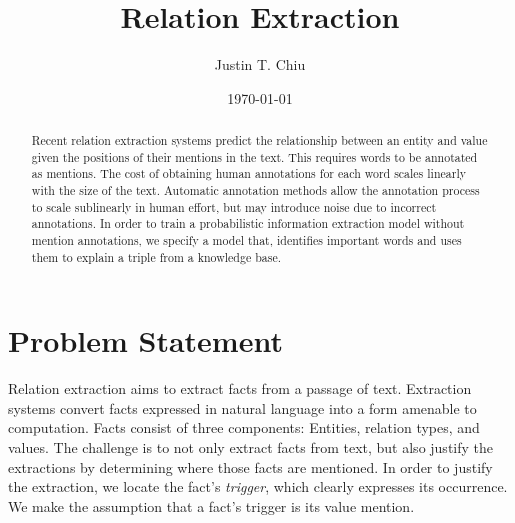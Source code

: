 \documentclass[12pt]{article}
\title{Relation Extraction}
\author{
Justin T. Chiu
}
\date{\today}
\begin{document}
\maketitle

\begin{abstract}
Recent relation extraction systems predict the relationship between
an entity and value given the positions of their mentions in the text.
This requires words to be annotated as mentions.
The cost of obtaining human annotations for each word scales
linearly with the size of the text.
Automatic annotation methods allow the annotation process to scale sublinearly
in human effort, but may introduce noise due to incorrect annotations.
In order to train a probabilistic information extraction model without mention
annotations, we specify a model that, identifies important words 
and uses them to explain a triple from a knowledge base.
\end{abstract}

\section{Problem Statement}
\begin{comment}
NOTE on RE vs KBP: KBP focuses on modeling the full database, whereas
in RE the emphasis is on explaining extractions.
KBP usually has a more complicated model over the KB,
while RE sometimes makes simplifying assumptions and could make a poor
KBP system.
Example: if triple double appears in text and someone scored < 10 PTS,
then it's more likely they more likely had > 10 REB.
The difference between RE and KBP is subtle. Both fall under
information extraction, and the models may overlap in many ways.
In fact, latent variable model approaches to RE are usually able to perform KBP as well.
However, the focus is usually not on having good aggregate extraction metrics,
but rather about identifying where facts are in text.
This leads to simplifying assumptions in the model of the KB itself.
On the other hand, KBP moves the difficulty from explaining extractions to
faithfully modeling the KB.
Typically this results in a challenging inference task, as the structure
of the KB may be very complex.
\end{comment}

Relation extraction aims to extract facts from a passage of text.
Extraction systems convert facts expressed in natural language into a form
amenable to computation.
Facts consist of three components: Entities, relation types, and values.
The challenge is to not only extract facts from text, but also
justify the extractions by determining where those facts are mentioned.
In order to justify the extraction, we locate the fact's \textit{trigger},
which clearly expresses its occurrence.
We make the assumption that a fact's trigger is its value mention.
\end{document}
